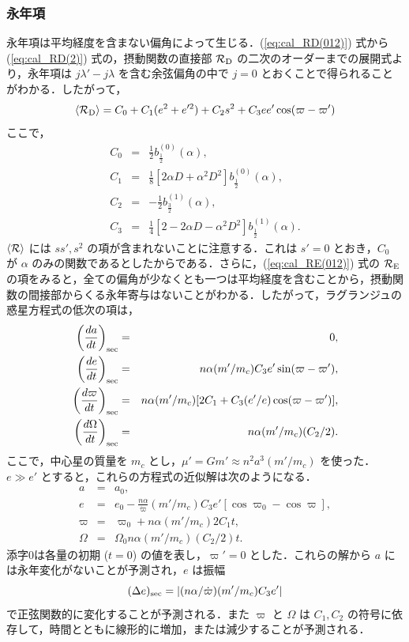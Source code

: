 \documentclass[11pt,a4paper,oneside,onecolumn]{jarticle}
\begin{document}
\subsubsection{永年項}
永年項は平均経度を含まない偏角によって生じる．(\ref{eq:cal_RD(012)}) 式から (\ref{eq:cal_RD(2)}) 式の，摂動関数の直接部 ${\cal R}_{\rm D}$ の二次のオーダーまでの展開式より，永年項は $j \lambda' - j \lambda$ を含む余弦偏角の中で $j = 0$ とおくことで得られることがわかる．したがって，
\begin{equation}
\langle {\cal R}_{\rm D} \rangle = C_0 + C_1 (e^2 + e'^2) + C_2 s^2 + C_3 e e' \cos (\varpi - \varpi')
\end{equation}
ここで，
\begin{eqnarray}
C_0 & = & \frac{1}{2} b_{\frac{1}{2}}^{(0)} (\alpha), \\
C_1 & = & \frac{1}{8} [ 2 \alpha D + \alpha^2 D^2 ] b_{\frac{1}{2}}^{(0)} (\alpha), \\
C_2 & = & - \frac{1}{2} b_{\frac{3}{2}}^{(1)} (\alpha), \\
C_3 & = & \frac{1}{4} [ 2 - 2 \alpha D - \alpha^2 D^2 ] b_{\frac{1}{2}}^{(1)} (\alpha).
\end{eqnarray}
$\langle {\cal R} \rangle$ には $s s', s^2$ の項が含まれないことに注意する．これは $s' = 0$ とおき，$C_0$ が $\alpha$ のみの関数であるとしたからである．さらに，(\ref{eq:cal_RE(012)}) 式の ${\cal R}_{\rm E}$ の項をみると，全ての偏角が少なくとも一つは平均経度を含むことから，摂動関数の間接部からくる永年寄与はないことがわかる．したがって，ラグランジュの惑星方程式の低次の項は，
\begin{eqnarray}
\left( \frac{d a}{d t} \right)_{\rm sec} & = & 0, \\
\left( \frac{d e}{d t} \right)_{\rm sec} & = & n \alpha (m' / m_c) C_3 e' \sin (\varpi - \varpi'), \\
\left( \frac{d \varpi}{d t} \right)_{\rm sec} & = & n \alpha (m' / m_c) [2 C_1 + C_3 (e' / e) \cos (\varpi - \varpi') ], \\
\left( \frac{d \Omega}{d t} \right)_{\rm sec} & = & n \alpha (m' / m_c) (C_2 / 2).
\end{eqnarray}
ここで，中心星の質量を $m_c$ とし，$\mu' = G m' \approx n^2 a^3 (m' / m_c)$ を使った．$e \gg e'$ とすると，これらの方程式の近似解は次のようになる．
\begin{eqnarray}
a & = & a_0, \\
e & = & e_0 - \frac{n \alpha}{\dot{\varpi}} (m' / m_c) C_3 e' [\cos \varpi_0 - \cos \varpi], \\
\varpi & = & \varpi_0 + n \alpha (m' / m_c) 2 C_1 t, \\
\Omega & = & \Omega_0 n \alpha (m' / m_c) (C_2 / 2) t.
\end{eqnarray}
添字0は各量の初期 ($t = 0$) の値を表し，$\varpi' = 0$ とした．これらの解から $a$ には永年変化がないことが予測され，$e$ は振幅
\begin{equation}
(\Delta e)_{\rm sec} = | (n \alpha /\dot{\varpi}) (m' / m_c) C_3 e' |
\end{equation}
で正弦関数的に変化することが予測される．また $\varpi$ と $\Omega$ は $C_1, C_2$ の符号に依存して，時間とともに線形的に増加，または減少することが予測される．
\end{document}
